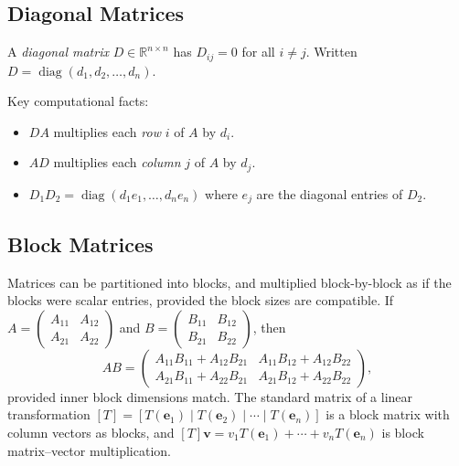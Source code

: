 \subsection{Diagonal Matrices}

\begin{tcolorbox}[colback=propbox, colframe=propborder, arc=2pt,
  left=6pt, right=6pt, top=4pt, bottom=4pt,
  title={\small\textbf{Definition (Diagonal Matrix)}},
  fonttitle=\small\bfseries]
A \emph{diagonal matrix} $D \in \mathbb{R}^{n \times n}$ has $D_{ij} = 0$
for all $i \neq j$.
Written $D = \operatorname{diag}(d_1, d_2, \ldots, d_n)$.

Key computational facts:
\begin{itemize}
  \item $DA$ multiplies each \emph{row} $i$ of $A$ by $d_i$.
  \item $AD$ multiplies each \emph{column} $j$ of $A$ by $d_j$.
  \item $D_1 D_2 = \operatorname{diag}(d_1 e_1, \ldots, d_n e_n)$ where $e_j$ are the diagonal entries of $D_2$.
\end{itemize}
\end{tcolorbox}

\subsection{Block Matrices}

\begin{remark*}
Matrices can be partitioned into blocks, and multiplied block-by-block
as if the blocks were scalar entries, provided the block sizes are
compatible.
If $A = \begin{pmatrix} A_{11} & A_{12} \\ A_{21} & A_{22} \end{pmatrix}$
and $B = \begin{pmatrix} B_{11} & B_{12} \\ B_{21} & B_{22} \end{pmatrix}$,
then
\[
  AB = \begin{pmatrix}
    A_{11}B_{11} + A_{12}B_{21} & A_{11}B_{12} + A_{12}B_{22} \\
    A_{21}B_{11} + A_{22}B_{21} & A_{21}B_{12} + A_{22}B_{22}
  \end{pmatrix},
\]
provided inner block dimensions match.
The standard matrix of a linear transformation $[T] = [T(\mathbf{e}_1) \mid T(\mathbf{e}_2) \mid \cdots \mid T(\mathbf{e}_n)]$
is a block matrix with column vectors as blocks, and
$[T]\mathbf{v} = v_1 T(\mathbf{e}_1) + \cdots + v_n T(\mathbf{e}_n)$
is block matrix--vector multiplication.
\end{remark*}
